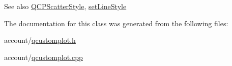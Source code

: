 \begin{DoxySeeAlso}{\-See also}
\hyperlink{classQCPScatterStyle}{\-Q\-C\-P\-Scatter\-Style}, \hyperlink{classQCPGraph_a513fecccff5b2a50ce53f665338c60ff}{set\-Line\-Style} 
\end{DoxySeeAlso}


\-The documentation for this class was generated from the following files\-:\begin{DoxyCompactItemize}
\item 
account/\hyperlink{qcustomplot_8h}{qcustomplot.\-h}\item 
account/\hyperlink{qcustomplot_8cpp}{qcustomplot.\-cpp}\end{DoxyCompactItemize}
